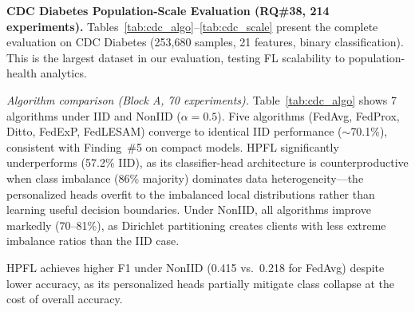 \documentclass[conference]{IEEEtran}
\begin{document}
\smallskip\noindent\textbf{CDC Diabetes Population-Scale Evaluation (RQ\#38, 214 experiments).}
\label{sec:cdc}
Tables~\ref{tab:cdc_algo}--\ref{tab:cdc_scale} present the complete evaluation on CDC Diabetes (253,680 samples, 21 features, binary classification). This is the largest dataset in our evaluation, testing FL scalability to population-health analytics.

\smallskip\noindent\textit{Algorithm comparison (Block A, 70 experiments).} Table~\ref{tab:cdc_algo} shows 7 algorithms under IID and NonIID ($\alpha{=}0.5$). Five algorithms (FedAvg, FedProx, Ditto, FedExP, FedLESAM) converge to identical IID performance ($\sim$70.1\%), consistent with Finding~\#5 on compact models. HPFL significantly underperforms (57.2\% IID), as its classifier-head architecture is counterproductive when class imbalance (86\% majority) dominates data heterogeneity---the personalized heads overfit to the imbalanced local distributions rather than learning useful decision boundaries. Under NonIID, all algorithms improve markedly (70--81\%), as Dirichlet partitioning creates clients with less extreme imbalance ratios than the IID case.

\begin{table}[htbp]
\centering
\caption{CDC Diabetes: Algorithm Comparison (Block A, 70 exp.). $K{=}5$, 20 rounds, 3 local epochs, no DP. Mean $\pm$ std over 5 seeds.}
\label{tab:cdc_algo}
\par{\footnotesize HPFL achieves higher F1 under NonIID (0.415 vs.\ 0.218 for FedAvg) despite lower accuracy, as its personalized heads partially mitigate class collapse at the cost of overall accuracy.}
\end{table}
\end{document}
